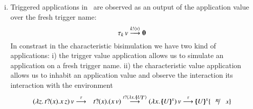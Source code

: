 \begin{enumerate}[i)]
	\item 	Triggered applications in~\cite{JeffreyR05}
		are observed as an output of the application
		value over the fresh trigger name:
		\[
			\tau_k\,v \stackrel{k ! \langle v \rangle}{\longrightarrow} \mathbf{0}
		\]
		In constrast in the characteristic bisimulation
		we have two kind of applications:
		i) the trigger value application allows us
		to simulate an application on a fresh trigger name.
		ii) the characteristic value application
		allows us to inhabit an application value 
		and observe the interaction its interaction
		with the environment
		\begin{eqnarray*}
			\appl{(\abs{z}{\binp{t}{x} \appl{x}{z}})}{v} &\by{\tau}& \binp{t}{x} (\appl{x}{v})
			\by{\bactinp{t}{\abs{x}{\mapchar{U}{x}}}}
			\appl{(\abs{x}{\mapchar{U}{x}})}{v}
			\by{\tau} \mapchar{U}{x} \subst{n}{x}
		\end{eqnarray*}
\end{enumerate}


\else\fi
